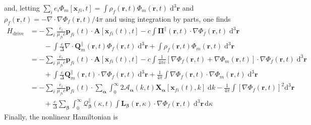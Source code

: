 \documentclass{article}
\begin{document}
and, letting $\sum_ie_i\Phi_m[\mathbf{x}_{fi},t] = \int\rho_f(\mathbf{r},t)\Phi_m(\mathbf{r},t)\;\mathrm{d}^3\mathbf{r}$ and $\rho_f(\mathbf{r},t) = -\nabla\cdot\nabla\Phi_f(\mathbf{r},t)/4\pi$ and using integration by parts, one finds
\begin{equation}
\begin{split}
H_\mathrm{drive} &= -\sum_i\frac{e_i}{\mu_{fi}c}\mathbf{p}_{fi}(t)\cdot\mathbf{A}[\mathbf{x}_{fi}(t),t] - c\int\bm{\Pi}^\parallel(\mathbf{r},t)\cdot\nabla\Phi_f(\mathbf{r},t)\;\mathrm{d}^3\mathbf{r}\\
&\qquad - \int\frac{e}{\Delta}\nabla\cdot\mathbf{Q}_m^\parallel(\mathbf{r},t)\Phi_f(\mathbf{r},t)\;\mathrm{d}^3\mathbf{r} + \int\rho_f(\mathbf{r},t)\Phi_m(\mathbf{r},t)\;\mathrm{d}^3\mathbf{r}\\
&= -\sum_i\frac{e_i}{\mu_{fi}c}\mathbf{p}_{fi}(t)\cdot\mathbf{A}[\mathbf{x}_{fi}(t),t] - c\int\frac{1}{4\pi c}\left[\nabla\Phi_f(\mathbf{r},t) + \nabla\Phi_m(\mathbf{r},t)\right]\cdot\nabla\Phi_f(\mathbf{r},t)\;\mathrm{d}^3\mathbf{r}\\
&\qquad + \int\frac{e}{\Delta}\mathbf{Q}_m^\parallel(\mathbf{r},t)\cdot\nabla\Phi_f(\mathbf{r},t)\;\mathrm{d}^3\mathbf{r} + \frac{1}{4\pi}\int\nabla\Phi_f(\mathbf{r},t)\cdot\nabla\Phi_m(\mathbf{r},t)\;\mathrm{d}^3\mathbf{r}\\
&= -\sum_i\frac{e_i}{\mu_{fi}c}\mathbf{p}_{fi}(t)\cdot\sum_{\bm{\alpha}}\int_0^\infty 2\mathcal{A}_{\bm{\alpha}}(k,t)\mathbf{X}_{\bm{\alpha}}[\mathbf{x}_{fi}(t),k]\;\mathrm{d}k - \frac{1}{4\pi}\int\left[\nabla\Phi_f(\mathbf{r},t)\right]^2\mathrm{d}^3\mathbf{r}\\
&\qquad + \frac{e}{\Delta}\sum_{\bm{\beta}}\int_0^\infty\mathcal{Q}_{\bm{\beta}}^\parallel(\kappa,t)\int\mathbf{L}_{\bm{\beta}}(\mathbf{r},\kappa)\cdot\nabla\Phi_f(\mathbf{r},t)\;\mathrm{d}^3\mathbf{r}\,\mathrm{d}\kappa
\end{split}
\end{equation}
Finally, the nonlinear Hamiltonian is
\end{document}
